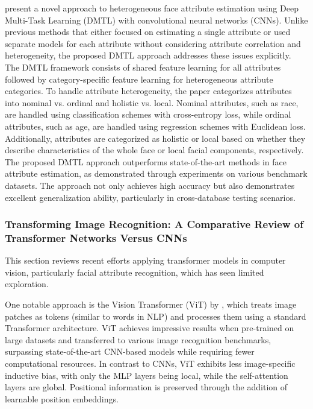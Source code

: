 \documentclass[a4paper,oneside]{article}
\begin{document}
\citet{DBLP:journals/corr/HanJSC17} present a novel approach to heterogeneous face attribute estimation using Deep Multi-Task Learning (DMTL) with convolutional neural networks (CNNs).
Unlike previous methods that either focused on estimating a single attribute or used separate models for each attribute without considering attribute correlation and heterogeneity, the proposed DMTL approach addresses these issues explicitly.
The DMTL framework consists of shared feature learning for all attributes followed by category-specific feature learning for heterogeneous attribute categories.
To handle attribute heterogeneity, the paper categorizes attributes into nominal vs. ordinal and holistic vs. local.
Nominal attributes, such as race, are handled using classification schemes with cross-entropy loss, while ordinal attributes, such as age, are handled using regression schemes with Euclidean loss.
Additionally, attributes are categorized as holistic or local based on whether they describe characteristics of the whole face or local facial components, respectively.
The proposed DMTL approach outperforms state-of-the-art methods in face attribute estimation, as demonstrated through experiments on various benchmark datasets.
The approach not only achieves high accuracy but also demonstrates excellent generalization ability, particularly in cross-database testing scenarios.

\subsubsection{Transforming Image Recognition: A Comparative Review of Transformer Networks Versus CNNs}
This section reviews recent efforts applying transformer models in computer vision, particularly facial attribute recognition, which has seen limited exploration.

One notable approach is the Vision Transformer (ViT) by \citet{DBLP:journals/corr/abs-2010-11929}, which treats image patches as tokens (similar to words in NLP) and processes them using a standard Transformer architecture.
ViT achieves impressive results when pre-trained on large datasets and transferred to various image recognition benchmarks, surpassing state-of-the-art CNN-based models while requiring fewer computational resources.
In contrast to CNNs, ViT exhibits less image-specific inductive bias, with only the MLP layers being local, while the self-attention layers are global.
Positional information is preserved through the addition of learnable position embeddings. 
\end{document}
